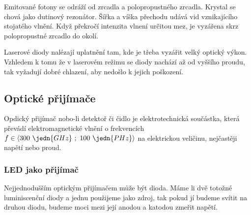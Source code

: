 Emitované fotony se odráží od zrcadla a polopropustného zrcadla.  Krystal se chová jako dutinový rezonátor. Šířka a víška přechodu udává vid vznikajícího stojatého vlnění. Když překročí intenzita vlnení určitou mez, je vyzářena skrz polopropustné zrcadlo do okolí.

Laserové diody nalézají uplatnění tam, kde je třeba vyzářit velký optický výkon. Vzhledem k tomu že v laserovém režimu se diody nachází až od vyššího proudu, tak vyžadují dobré chlazení, aby nedošlo k jejich poškození.

\subsection{Optické přijímače}
Opdický přijímač nobo-li detektoř či čidlo je elektrotechnická součástka, která převádí elektromagnetické vlnění o frekvencích $f \in \langle 300~\jedn{GHz}~;~100~\jedn{PHz} \rangle$ na elektrickou veličinu, nejčastěji napětí nebo proud.

\subsubsection{LED jako přijímač}
Nejjednodušším optickým přijímačem může být  dioda. Máme li dvě totožné luminiscenční diody a jednu použijeme jako zdroj, tak pokud jí budeme svítit na druhou diodu, budeme moci mezi její anodou a katodou zmeřit napětí.

